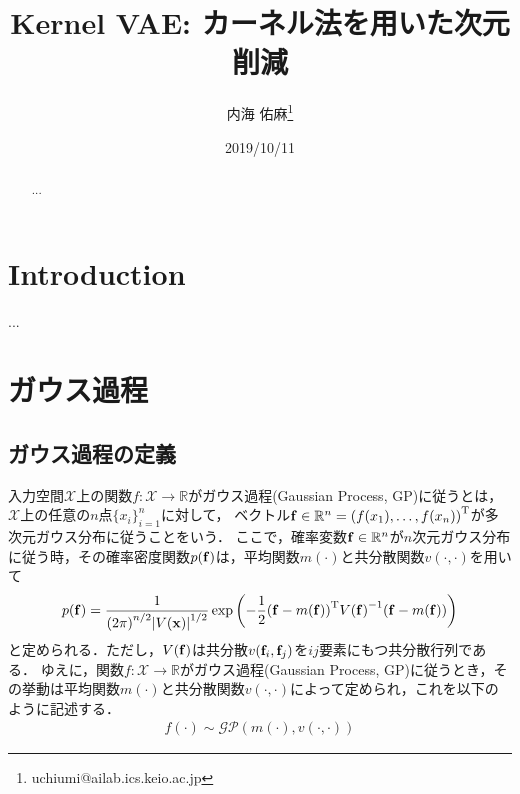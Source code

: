 \documentclass[11pt,a4j]{article}
\title{Kernel VAE: カーネル法を用いた次元削減}
\date{2019/10/11}
\author[1]{内海 佑麻\thanks{uchiumi@ailab.ics.keio.ac.jp}}
\affil[1]{慶應義塾大学理工学部情報工学科}
\begin{document}
  \maketitle
  
  \begin{abstract}
    ...
  \end{abstract}


  \section{Introduction}
    ...
  \section{ガウス過程}
    \subsection{ガウス過程の定義}
      入力空間$\mathcal{X}$上の関数$f: \mathcal{X} \to \mathbb{R}$がガウス過程(Gaussian Process, GP)に従うとは，$\mathcal{X}$上の任意の$n$点${ \{ x_i \} }_{i=1}^{n}$に対して，
      ベクトル${\bf f} \in \mathbb{R}^{n} = { ( f(x_1),\dots,f(x_n) ) }^{\mathrm{T}}$が多次元ガウス分布に従うことをいう．
      ここで，確率変数${\bf f} \in \mathbb{R}^{n}$が$n$次元ガウス分布に従う時，その確率密度関数$p({\bf f})$は，平均関数${m}(\cdot)$と共分散関数$v(\cdot,\cdot)$を用いて
      \begin{align}
        p({\bf f}) = \frac{1}{ {(2 \pi)}^{n/2} {| V({\bf x}) |}^{1/2} } \exp \left( {- \frac{1}{2}} {({\bf f} - m(\bf f))}^{\mathrm{T}} {V({\bf f})}^{-1} ({\bf f} - m(\bf f)) \right)
      \end{align}
      と定められる．ただし，$V({\bf f})$は共分散$v({\bf f}_i, {\bf f}_j)$を$ij$要素にもつ共分散行列である．
      ゆえに，関数$f: \mathcal{X} \to \mathbb{R}$がガウス過程(Gaussian Process, GP)に従うとき，その挙動は平均関数${m}(\cdot)$と共分散関数$v(\cdot,\cdot)$によって定められ，これを以下のように記述する．
      \begin{align}
        f(\cdot) \sim \mathcal{GP}(m(\cdot), v(\cdot,\cdot))
      \end{align}
\end{document}
